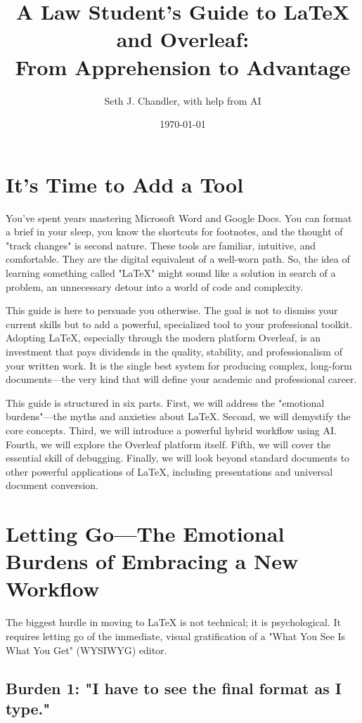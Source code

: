 \documentclass[12pt]{article}
\title{A Law Student's Guide to LaTeX and Overleaf: \\ From Apprehension to Advantage}
\author{Seth J. Chandler, with help from AI}
\date{\today}
\begin{document}
\maketitle %

\section*{It's Time to Add a Tool}

You've spent years mastering Microsoft Word and Google Docs. You can format a brief in your sleep, you know the shortcuts for footnotes, and the thought of "track changes" is second nature. These tools are familiar, intuitive, and comfortable. They are the digital equivalent of a well-worn path. So, the idea of learning something called "LaTeX" might sound like a solution in search of a problem, an unnecessary detour into a world of code and complexity.

This guide is here to persuade you otherwise. The goal is not to dismiss your current skills but to add a powerful, specialized tool to your professional toolkit. Adopting LaTeX, especially through the modern platform Overleaf, is an investment that pays dividends in the quality, stability, and professionalism of your written work. It is the single best system for producing complex, long-form documents—the very kind that will define your academic and professional career.

This guide is structured in six parts. First, we will address the "emotional burdens"—the myths and anxieties about LaTeX. Second, we will demystify the core concepts. Third, we will introduce a powerful hybrid workflow using AI. Fourth, we will explore the Overleaf platform itself. Fifth, we will cover the essential skill of debugging. Finally, we will look beyond standard documents to other powerful applications of LaTeX, including presentations and universal document conversion.

\section{Letting Go—The Emotional Burdens of Embracing a New Workflow}

The biggest hurdle in moving to LaTeX is not technical; it is psychological. It requires letting go of the immediate, visual gratification of a "What You See Is What You Get" (WYSIWYG) editor.

\subsection{Burden 1: "I have to see the final format as I type."}
\end{document}
